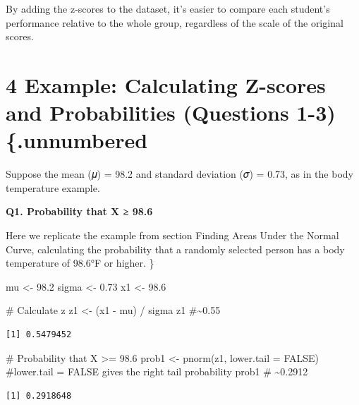 \documentclass[
  letterpaper,
  DIV=11,
  numbers=noendperiod]{scrreprt}
\newenvironment{Shaded}{\begin{snugshade}}{\end{snugshade}}
\newcommand{\AttributeTok}[1]{\textcolor[rgb]{0.40,0.45,0.13}{#1}}
\newcommand{\CommentTok}[1]{\textcolor[rgb]{0.37,0.37,0.37}{#1}}
\newcommand{\ConstantTok}[1]{\textcolor[rgb]{0.56,0.35,0.01}{#1}}
\newcommand{\FloatTok}[1]{\textcolor[rgb]{0.68,0.00,0.00}{#1}}
\newcommand{\FunctionTok}[1]{\textcolor[rgb]{0.28,0.35,0.67}{#1}}
\newcommand{\NormalTok}[1]{\textcolor[rgb]{0.00,0.23,0.31}{#1}}
\newcommand{\OtherTok}[1]{\textcolor[rgb]{0.00,0.23,0.31}{#1}}
\newcommand{\SpecialCharTok}[1]{\textcolor[rgb]{0.37,0.37,0.37}{#1}}
\begin{document}
By adding the z-scores to the dataset, it's easier to compare each
student's performance relative to the whole group, regardless of the
scale of the original scores.

\section{4 Example: Calculating Z-scores and Probabilities (Questions
1-3)
\{.unnumbered}\label{example-calculating-z-scores-and-probabilities-questions-1-3-.unnumbered}

Suppose the mean (𝜇) = 98.2 and standard deviation (𝜎) = 0.73, as in the
body temperature example.

\textbf{Q1. Probability that X ≥ 98.6}

Here we replicate the example from section Finding Areas Under the
Normal Curve, calculating the probability that a randomly selected
person has a body temperature of 98.6°F or higher. \}

\begin{Shaded}
\begin{Highlighting}[]
\NormalTok{mu }\OtherTok{\textless{}{-}} \FloatTok{98.2} 
\NormalTok{sigma }\OtherTok{\textless{}{-}} \FloatTok{0.73} 
\NormalTok{x1 }\OtherTok{\textless{}{-}} \FloatTok{98.6} 
 
\CommentTok{\# Calculate z }
\NormalTok{z1 }\OtherTok{\textless{}{-}}\NormalTok{ (x1 }\SpecialCharTok{{-}}\NormalTok{ mu) }\SpecialCharTok{/}\NormalTok{ sigma }
\NormalTok{z1 }\CommentTok{\#\textasciitilde{}0.55 }
\end{Highlighting}
\end{Shaded}

\begin{verbatim}
[1] 0.5479452
\end{verbatim}

\begin{Shaded}
\begin{Highlighting}[]
\CommentTok{\# Probability that X \textgreater{}= 98.6 }
\NormalTok{prob1 }\OtherTok{\textless{}{-}} \FunctionTok{pnorm}\NormalTok{(z1, }\AttributeTok{lower.tail =} \ConstantTok{FALSE}\NormalTok{) }\CommentTok{\#lower.tail = FALSE gives the right tail probability }
\NormalTok{prob1   }\CommentTok{\# \textasciitilde{}0.2912 }
\end{Highlighting}
\end{Shaded}

\begin{verbatim}
[1] 0.2918648
\end{verbatim}
\end{document}

